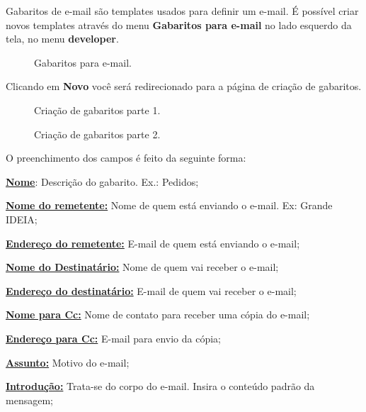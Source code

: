 \documentclass[9pt]{report}
\begin{document}
{      Gabaritos de e-mail são templates usados para definir um e-mail. É possível criar novos templates através do menu \textbf{Gabaritos para e-mail} no lado esquerdo da tela, no menu \textbf{developer}.

      \begin{figure}[H]
        \caption{Gabaritos para e-mail.}
        \label{fig:gabaritosemail}
      \end{figure}

      Clicando em \textbf{Novo} você será redirecionado para a página
      de criação de gabaritos.

      \begin{figure}[H]
        \caption{Criação de gabaritos parte 1.}
        \label{fig:novogabaritosemail1}
      \end{figure}

      \begin{figure}[H]
        \caption{Criação de gabaritos parte 2.}
        \label{fig:novogabaritosemail2}
      \end{figure}

      O preenchimento dos campos é feito da seguinte forma:
      
      \underline{\textbf{Nome}}: Descrição do gabarito. Ex.: Pedidos;
      
      \underline{\textbf{Nome do remetente:}} Nome de quem está
      enviando o e-mail.
      Ex: Grande IDEIA;
      
      \underline{\textbf{Endereço do remetente:}} E-mail de quem
      está enviando o e-mail;
      
      \underline{\textbf{Nome do Destinatário:}} Nome de quem vai
      receber o e-mail;
      
      \underline{\textbf{Endereço do destinatário:}} E-mail de quem
      vai receber o e-mail;
      
      \underline{\textbf{Nome para Cc:}} Nome de contato para receber
      uma cópia do e-mail;
      
      \underline{\textbf{Endereço para Cc:}} E-mail para envio da
      cópia;
      
      \underline{\textbf{Assunto:}} Motivo do e-mail;
      
      \underline{\textbf{Introdução:}} Trata-se do corpo do e-mail.
      Insira o conteúdo padrão da mensagem;
      
}
\end{document}
